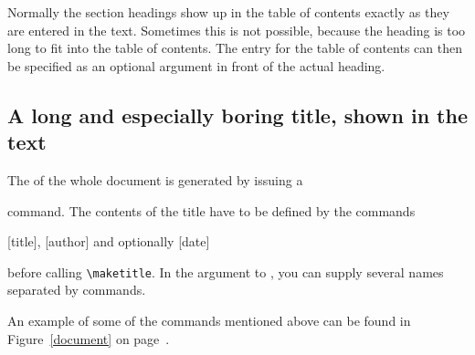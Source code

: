 Normally the section headings show up in the table of contents exactly
as they are entered in the text. Sometimes this is not possible,
because the heading is too long to fit into the table of contents. The
entry for the table of contents can then be specified as an
optional argument in front of the actual heading.

\begin{example}[standalone, paperwidth=7cm,paperheight=5cm]
\tableofcontents

\section[Title for the
  table of contents]{A long 
  and especially boring title,
  shown in the text}
\end{example}

The  of the whole document is generated by issuing a
\begin{lscommand}
\end{lscommand}
\noindent command. The contents of the title have to be defined by the commands
\begin{lscommand}
  [title], [author]
  and optionally [date]
\end{lscommand}
\noindent before calling \verb|\maketitle|. In the argument to , you can supply several names separated by  commands.

An example of some of the commands mentioned above can be found in
Figure~\ref{document} on page~\pageref{document}.

